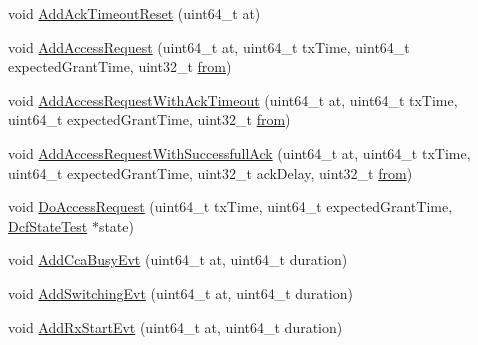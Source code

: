 \begin{DoxyCompactItemize}
\item 
void \hyperlink{classDcfManagerTest_a081b8bf721408569afe6db724f089da9}{Add\+Ack\+Timeout\+Reset} (uint64\+\_\+t at)
\item 
void \hyperlink{classDcfManagerTest_a1f016026b88c036eed9ce87bfc32b71a}{Add\+Access\+Request} (uint64\+\_\+t at, uint64\+\_\+t tx\+Time, uint64\+\_\+t expected\+Grant\+Time, uint32\+\_\+t \hyperlink{lte__amc_8m_a1b4c81ff74eb1a626b5ade44c81004b3}{from})
\item 
void \hyperlink{classDcfManagerTest_aac77cbb3419f2760b9695e7b79353aed}{Add\+Access\+Request\+With\+Ack\+Timeout} (uint64\+\_\+t at, uint64\+\_\+t tx\+Time, uint64\+\_\+t expected\+Grant\+Time, uint32\+\_\+t \hyperlink{lte__amc_8m_a1b4c81ff74eb1a626b5ade44c81004b3}{from})
\item 
void \hyperlink{classDcfManagerTest_a98a7afae46c656a90246728368e2816a}{Add\+Access\+Request\+With\+Successfull\+Ack} (uint64\+\_\+t at, uint64\+\_\+t tx\+Time, uint64\+\_\+t expected\+Grant\+Time, uint32\+\_\+t ack\+Delay, uint32\+\_\+t \hyperlink{lte__amc_8m_a1b4c81ff74eb1a626b5ade44c81004b3}{from})
\item 
void \hyperlink{classDcfManagerTest_a51da33e9cc1cd9cef470ea06e9b2fb4a}{Do\+Access\+Request} (uint64\+\_\+t tx\+Time, uint64\+\_\+t expected\+Grant\+Time, \hyperlink{classDcfStateTest}{Dcf\+State\+Test} $\ast$state)
\item 
void \hyperlink{classDcfManagerTest_a1f7c71bc03f4754c2f1ae14562fad19e}{Add\+Cca\+Busy\+Evt} (uint64\+\_\+t at, uint64\+\_\+t duration)
\item 
void \hyperlink{classDcfManagerTest_ae0a3c939dbfcce920273ce345805d0ce}{Add\+Switching\+Evt} (uint64\+\_\+t at, uint64\+\_\+t duration)
\item 
void \hyperlink{classDcfManagerTest_a65603db11e1aa4c23c1a01d8e31f4899}{Add\+Rx\+Start\+Evt} (uint64\+\_\+t at, uint64\+\_\+t duration)
\end{DoxyCompactItemize}
